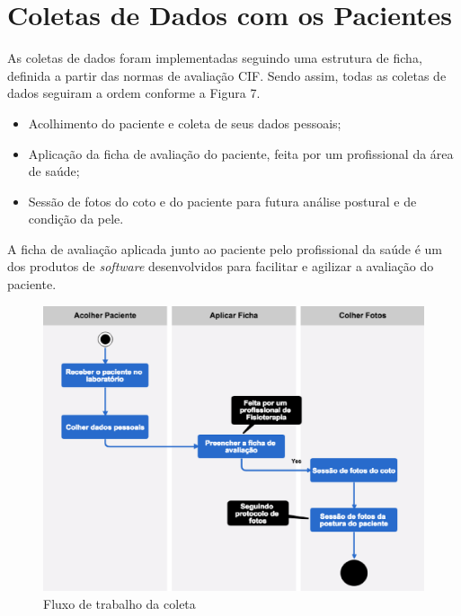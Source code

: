 \section{Coletas de Dados com os Pacientes}


    As coletas de dados foram implementadas seguindo uma estrutura de ficha, definida a partir das normas de avaliação CIF. Sendo assim, todas as coletas de dados seguiram a ordem conforme a Figura 7. 

    \begin{itemize}
        \item Acolhimento do paciente e coleta de seus dados pessoais;
        \item Aplicação da ficha de avaliação do paciente, feita por um profissional da área de saúde;
        \item Sessão de fotos do coto e do paciente para futura análise postural e de condição da pele.
    \end{itemize}

    A ficha de avaliação aplicada junto ao paciente pelo profissional da saúde é um dos produtos de \textit{software} desenvolvidos para facilitar e agilizar a avaliação do paciente.

    \begin{figure}[ht]
        \centering
        \label{fig07}
            \includegraphics[keepaspectratio=true, scale=0.4]{editaveis/images/colet_flow.eps}
        \caption{Fluxo de trabalho da coleta}
    \end{figure}


